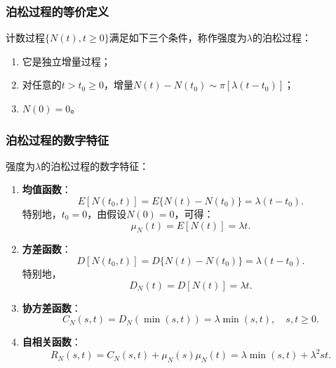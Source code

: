\documentclass[11pt,a4paper]{report}
\theoremstyle{definition}
\begin{document}
\subsubsection{泊松过程的等价定义}

计数过程$\{N(t),t\geq0\}$满足如下三个条件，称作强度为$\lambda$的泊松过程：
\begin{enumerate}[label=\arabic*.,leftmargin=2em]
    \item 它是独立增量过程；
    \item 对任意的$t>t_0\geq0$，增量$N(t)-N(t_0)\sim\pi[\lambda(t-t_0)]$；
    \item $N(0)=0$。
\end{enumerate}

\subsubsection{泊松过程的数字特征}

强度为$\lambda$的泊松过程的数字特征：
\begin{enumerate}[label=\arabic*.,leftmargin=2em]
    \item \textbf{均值函数}：
    \[
    E[N(t_0,t)]=E\{N(t)-N(t_0)\}=\lambda(t-t_0).
    \]
    特别地，$t_0=0$，由假设$N(0)=0$，可得：
    \[
    \mu_N(t)=E[N(t)]=\lambda t.
    \]
    \item \textbf{方差函数}：
    \[
    D[N(t_0,t)]=D\{N(t)-N(t_0)\}=\lambda(t-t_0).
    \]
    特别地，
    \[
    D_N(t)=D[N(t)]=\lambda t.
    \]
    \item \textbf{协方差函数}：
    \[
    C_N(s,t)=D_N(\min(s,t))=\lambda\min(s,t),\quad s,t\geq0.
    \]
    \item \textbf{自相关函数}：
    \[
    R_N(s,t)=C_N(s,t)+\mu_N(s)\mu_N(t)=\lambda\min(s,t)+\lambda^2st.
    \]
\end{enumerate}
\end{document}
